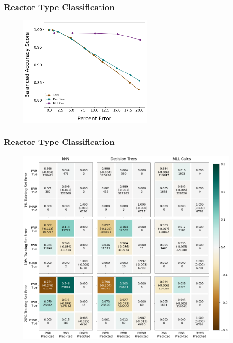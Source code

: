 \begin{frame}
  \frametitle{Reactor Type Classification}
    \begin{figure}
      \centering
      \includegraphics[width=0.6\textwidth]{./figures/randerr_compare_nuc29_BalAcc_rxtr.png}
    \end{figure}
\end{frame}

\begin{frame}
  \frametitle{Reactor Type Classification}
    \begin{figure}
      \centering
      \includegraphics[height=0.85\textheight]{./figures/confusion_matrix_nuc29_3errs.png}
    \end{figure}
\end{frame}

